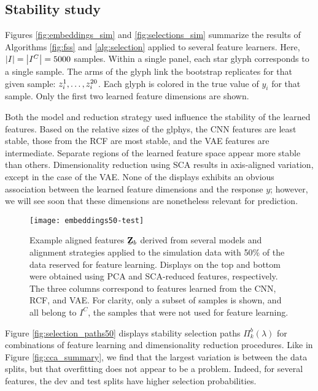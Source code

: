 \subsection{Stability study}

Figures \ref{fig:embeddings_sim} and \ref{fig:selections_sim} summarize the
results of Algorithms \ref{fig:fss} and \ref{alg:selection} applied to several
feature learners. Here, $\left|I\right| = \left|I^{C}\right| = 5000$ samples. Within a
single panel, each star glyph corresponds to a single sample. The arms of the
glyph link the bootstrap replicates for that given sample: $\protect z_{i}^{1},
\dots, z_{i}^{20}$. Each glyph is colored in the true value of $y_{i}$ for that
sample. Only the first two learned feature dimensions are shown.

Both the model and reduction strategy used influence the stability of the
learned features. Based on the relative sizes of the glphys, the CNN features
are least stable, those from the RCF are most stable, and the VAE features are
intermediate. Separate regions of the learned feature space appear more stable
than others. Dimensionality reduction using SCA results in axis-aligned
variation, except in the case of the VAE. None of the displays exhibits an
obvious association between the learned feature dimensions and the response $y$;
however, we will see soon that these dimensions are nonetheless relevant for
prediction.

\begin{figure}
  \centering
  \texttt{[image: embeddings50-test]}
  \caption{Example aligned features
    $\protect\underaccent{\bar}{\mathbf{Z}}_{b}$ derived from several models
    and alignment strategies applied to the simulation data with 50\% of the
    data reserved for feature learning. Displays on the top and bottom were
    obtained using PCA and SCA-reduced features, respectively. The three columns
    correspond to features learned from the CNN, RCF, and VAE. For clarity, only
    a subset of samples is shown, and all belong to $I^{C}$, the samples that
    were not used for feature learning.}
  \label{fig:embeddings50-test}
\end{figure}

 Figure \ref{fig:selection_paths50} displays stability selection paths
 $\Pi_{k}^{b}\left(\lambda\right)$ for combinations of feature learning and
 dimensionality reduction procedures. Like in Figure \ref{fig:cca_summary}, we
 find that the largest variation is between the data splits, but that
 overfitting does not appear to be a problem. Indeed, for several features, the
 dev and test splits have higher selection probabilities.

